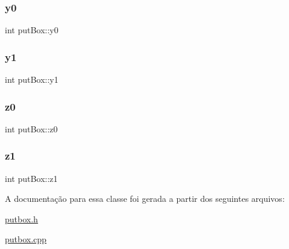\mbox{\label{classput_box_afdc1185312c60fc09bc47b546d81dac2}} 
\subsubsection{\texorpdfstring{y0}{y0}}
{\footnotesize\ttfamily int put\+Box\+::y0\hspace{0.3cm}{\ttfamily [protected]}}

\mbox{\label{classput_box_aaf76b850809e592b8657067f08d76992}} 
\subsubsection{\texorpdfstring{y1}{y1}}
{\footnotesize\ttfamily int put\+Box\+::y1\hspace{0.3cm}{\ttfamily [protected]}}

\mbox{\label{classput_box_ab6855c25ac8539a3473f01574ce6ecd9}} 
\subsubsection{\texorpdfstring{z0}{z0}}
{\footnotesize\ttfamily int put\+Box\+::z0\hspace{0.3cm}{\ttfamily [protected]}}

\mbox{\label{classput_box_a9624a64ff3a3250645fe2fec478e74c9}} 
\subsubsection{\texorpdfstring{z1}{z1}}
{\footnotesize\ttfamily int put\+Box\+::z1\hspace{0.3cm}{\ttfamily [protected]}}



A documentação para essa classe foi gerada a partir dos seguintes arquivos\+:\begin{DoxyCompactItemize}
\item 
\mbox{\hyperlink{putbox_8h}{putbox.\+h}}\item 
\mbox{\hyperlink{putbox_8cpp}{putbox.\+cpp}}\end{DoxyCompactItemize}
